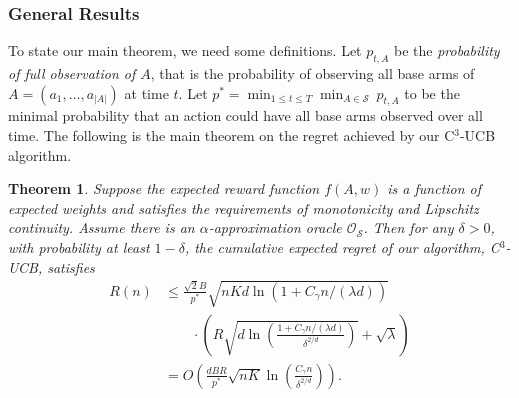 \documentclass{article}
\newcommand{\cO}{\mathcal{O}}
\newcommand{\cS}{\mathcal{S}}
\newcommand{\abs}[1]{\left| #1 \right|}
\newtheorem{theorem}{Theorem}[section]
\begin{document}
\subsubsection{General Results}

To state our main theorem, we need some definitions. Let $p_{t, A}$ be the {\em probability of full observation of $A$}, that is the probability of observing all base arms of $A = (a_1, \ldots, a_{\abs{A}})$ at time $t$. Let $p^* = \min_{1 \leq t \leq T} \min_{A \in \cS} ~ p_{t, A}$ to be the minimal probability that an action could have all base arms observed over all time. The following is the main theorem on the regret achieved by our C$^3$-UCB algorithm.

\begin{theorem} %
	\label{thm:main}
	Suppose the expected reward function $f(A, w)$ is a function of expected weights and satisfies the requirements of monotonicity and Lipschitz continuity. Assume there is an $\alpha$-approximation oracle $\cO_{\cS}$. Then for any $\delta > 0$, with probability at least $1 - \delta$, the cumulative expected regret of our algorithm, C$^3$-UCB, satisfies
	\begin{align}
		R(n) &\le \frac{\sqrt{2}B}{p^*} \sqrt{nKd\ln(1 + C_\gamma n/(\lambda d))}  \nonumber \\
		&\qquad \cdot \left(R\sqrt{d\ln \left( \frac{1 + C_\gamma n/(\lambda d)}{\delta^{2/d}}\right) } + \sqrt{\lambda}\right) \nonumber \\
		&=O\left(\frac{dBR}{p^*} \sqrt{nK} \ln \left(\frac{C_\gamma n}{\delta^{2/d}}\right) \right).
	\end{align}
\end{theorem}
\end{document}
